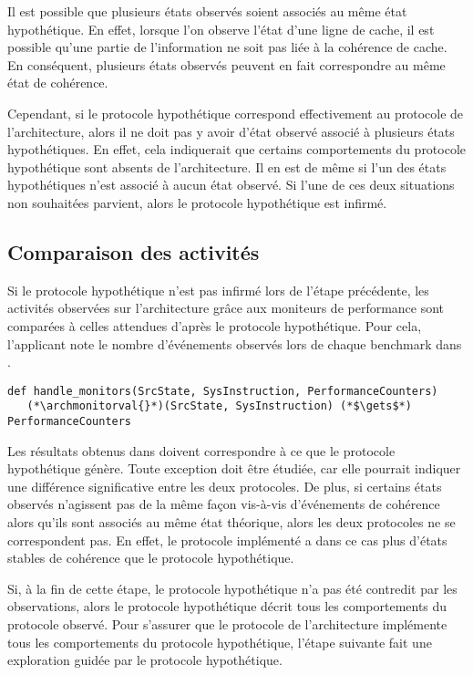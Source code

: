 Il est possible que plusieurs états observés soient associés au même état
hypothétique. En effet, lorsque l'on observe l'état d'une ligne de cache, il est
possible qu'une partie de l'information ne soit pas liée à la cohérence de
cache. En conséquent, plusieurs états observés peuvent en fait correspondre au
même état de cohérence.

Cependant, si le protocole hypothétique correspond effectivement au
protocole de l'architecture, alors il ne doit pas y avoir d'état
observé associé à plusieurs états hypothétiques. En effet,
cela indiquerait que certains comportements du protocole hypothétique
sont absents de l'architecture. Il en est de même si l'un des états
hypothétiques n'est associé à aucun état observé. Si l'une de ces deux
situations non souhaitées parvient, alors le protocole hypothétique
est infirmé.


\subsection{Comparaison des activités}
Si le protocole hypothétique n'est pas infirmé lors de l'étape précédente, les
activités observées sur l'architecture grâce aux moniteurs de performance sont
comparées à celles attendues d'après le protocole hypothétique. Pour cela, l'applicant note le nombre d'événements observés lors de chaque benchmark dans
\archmonitorval{}.

\begin{lstlisting}
def handle_monitors(SrcState, SysInstruction, PerformanceCounters)
   (*\archmonitorval{}*)(SrcState, SysInstruction) (*$\gets$*) PerformanceCounters
\end{lstlisting}

Les résultats obtenus dans \archmonitorval{} doivent correspondre à ce que le
protocole hypothétique génère. Toute exception doit être étudiée, car
elle pourrait indiquer une différence significative entre les deux protocoles.
De plus, si certains états observés n'agissent pas de la même façon vis-à-vis
d'événements de cohérence alors qu'ils sont associés au même état théorique,
alors les deux protocoles ne se correspondent pas. En effet, le protocole
implémenté a dans ce cas plus d'états stables de cohérence que le protocole
hypothétique.

Si, à la fin de cette étape, le protocole hypothétique n'a pas été contredit
par les observations, alors le protocole hypothétique décrit tous les
comportements du protocole observé. Pour s'assurer que le protocole de
l'architecture implémente tous les comportements du protocole hypothétique,
l'étape suivante fait une exploration guidée par le protocole hypothétique.

